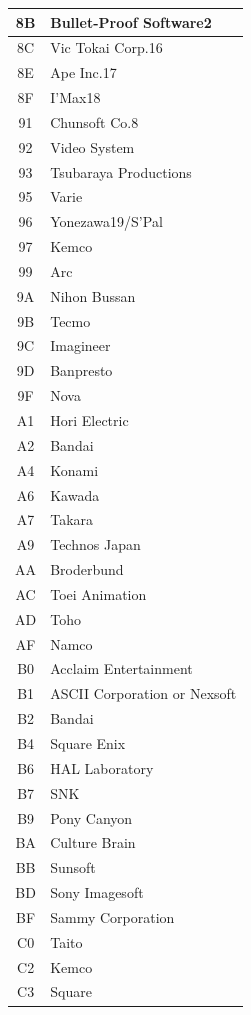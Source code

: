 \begin{longtable}{|c|l|}
8B & Bullet-Proof Software2 \\\hline
8C & Vic Tokai Corp.16 \\\hline
8E & Ape Inc.17 \\\hline
8F & I’Max18 \\\hline
91 & Chunsoft Co.8 \\\hline
92 & Video System \\\hline
93 & Tsubaraya Productions \\\hline
95 & Varie \\\hline
96 & Yonezawa19/S’Pal \\\hline
97 & Kemco \\\hline
99 & Arc \\\hline
9A & Nihon Bussan \\\hline
9B & Tecmo \\\hline
9C & Imagineer \\\hline
9D & Banpresto \\\hline
9F & Nova \\\hline
A1 & Hori Electric \\\hline
A2 & Bandai \\\hline
A4 & Konami \\\hline
A6 & Kawada \\\hline
A7 & Takara \\\hline
A9 & Technos Japan \\\hline
AA & Broderbund \\\hline
AC & Toei Animation \\\hline
AD & Toho \\\hline
AF & Namco \\\hline
B0 & Acclaim Entertainment \\\hline
B1 & ASCII Corporation or Nexsoft \\\hline
B2 & Bandai \\\hline
B4 & Square Enix \\\hline
B6 & HAL Laboratory \\\hline
B7 & SNK \\\hline
B9 & Pony Canyon \\\hline
BA & Culture Brain \\\hline
BB & Sunsoft \\\hline
BD & Sony Imagesoft \\\hline
BF & Sammy Corporation \\\hline
C0 & Taito \\\hline
C2 & Kemco \\\hline
C3 & Square \\\hline

\end{longtable}
